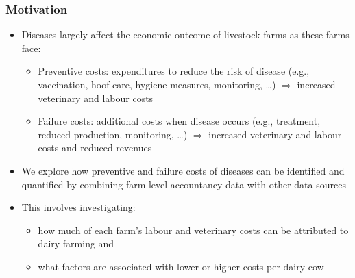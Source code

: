 \documentclass[t,24pt,aspectratio=169]{beamer}
\begin{document}
\begin{frame}[hvid]
\frametitle{\vspace{-3ex}Motivation}
\begin{itemize}
\setlength{\itemsep}{1.5ex}
    \item Diseases largely affect the economic outcome of livestock farms 
    as these farms face:
    \begin{itemize}
        \item Preventive costs: expenditures to reduce the risk of disease (e.g., vaccination, hoof care, hygiene measures, monitoring, \ldots) 
        $\Rightarrow$ increased veterinary and labour costs
        \item Failure costs: additional costs when disease occurs (e.g., treatment, reduced production, monitoring, \ldots)
        $\Rightarrow$ increased veterinary and labour costs and reduced revenues
    \end{itemize}
    \item We explore how preventive and failure costs of diseases 
        can be identified and quantified
        by combining farm-level accountancy data with other data sources
    \item This involves investigating:
    \begin{itemize}
        \item how much of each farm's labour and veterinary costs 
        can be attributed to dairy farming and
        \item what factors are associated with lower or higher costs per dairy cow
    \end{itemize}
\end{itemize}
\end{frame}
\end{document}
